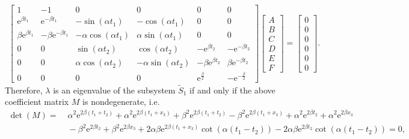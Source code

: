 \documentclass[a4paper,11pt]{article}
\begin{document}
\begin{appendices}
\begin{equation*}
\begin{split}
\left[\begin{array}{cccccc} 1 & -1 & 0 & 0 & 0 & 0\\ \mathrm{e}^{\beta t_1} & \mathrm{e}^{- \beta t_1} & - \sin\!\left(\alpha t_1\right) & - \cos\!\left(\alpha t_1\right) & 0 & 0\\ \beta \mathrm{e}^{\beta t_1} & - \beta \mathrm{e}^{- \beta t_1} & - \alpha \cos\!\left(\alpha t_1\right) & \alpha \sin\!\left(\alpha t_1\right) & 0 & 0\\ 0 & 0 & \sin\!\left(\alpha t_2\right) & \cos\!\left(\alpha t_2\right) & - \mathrm{e}^{\beta t_2} & - \mathrm{e}^{- \beta t_2}\\ 0 & 0 & \alpha \cos\!\left(\alpha t_2\right) & - \alpha \sin\!\left(\alpha t_2\right) & - \beta \mathrm{e}^{\beta t_2} & \beta \mathrm{e}^{- \beta t_2}\\ 0 & 0 & 0 & 0 & \mathrm{e}^{\frac{\beta}{2}} & - \mathrm{e}^{-\frac{\beta}{2}} \end{array}\right]
\left[\begin{array}{c} A \\ B \\ C \\ D \\ E \\ F \end{array}\right]
=
\left[\begin{array}{c} 0 \\ 0 \\ 0 \\ 0 \\ 0 \\ 0 \end{array}\right].
\end{split}
\end{equation*}
Therefore, $\lambda$ is an eigenvalue of the subsystem $\tilde{S}_1$ if and only if the above coefficient matrix $M$ is nondegenerate, i.e.
\begin{equation*}
\begin{split}
\det(M) =&\; \alpha^2 \mathrm{e}^{2 \beta (t_1 + t_2)}  + \alpha^2 \mathrm{e}^{2 \beta (t_1 + x_{3})}
+ \beta^2 \mathrm{e}^{2 \beta (t_1 + t_2)} - \beta^2 \mathrm{e}^{2 \beta (t_1 + x_{3})}
+ \alpha^2 \mathrm{e}^{2 \beta t_2}  + \alpha^2 \mathrm{e}^{2 \beta x_{3}} \\
&\; - \beta^2 \mathrm{e}^{2 \beta t_2} + \beta^2 \mathrm{e}^{2 \beta x_{3}}
+ 2 \alpha \beta \mathrm{e}^{2 \beta (t_1 + x_{3})} \cot(\alpha (t_1 - t_2)) - 2 \alpha \beta \mathrm{e}^{2 \beta t_2} \cot(\alpha (t_1 - t_2)) = 0,

\end{split}
\end{equation*}
\end{appendices}
\end{document}
